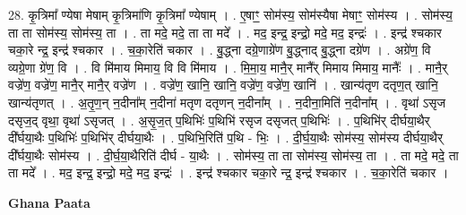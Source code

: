 \documentclass[17pt]{extarticle}
\begin{document}
28. कृ॒त्रिमा᳚ ण्येषा मेषाम् कृ॒त्रिमा॑णि कृ॒त्रिमा᳚ ण्येषाम् । . ए॒षाꣳ॒॒ सोम॑स्य॒ सोम॑स्यैषा मेषाꣳ॒॒ सोम॑स्य । . सोम॑स्य॒ ता ता सोम॑स्य॒ सोम॑स्य॒ ता । . ता मदे॒ मदे॒ ता ता मदे᳚ । . मद॒ इन्द्र॒ इन्द्रो॒ मदे॒ मद॒ इन्द्रः॑ । . इन्द्र॑ श्चकार चका॒रे न्द्र॒ इन्द्र॑ श्चकार । . च॒का॒रेति॑ चकार । . बु॒द्ध्ना दग्रे॒णाग्रे॑ण बु॒द्ध्नाद् बु॒द्ध्ना दग्रे॑ण । . अग्रे॑ण॒ वि व्यग्रे॒णा ग्रे॑ण॒ वि । . वि मि॑माय मिमाय॒ वि वि मि॑माय । . मि॒मा॒य॒ मानै॒र् मानै᳚र् मिमाय मिमाय॒ मानैः᳚ । . मानै॒र् वज्रे॑ण॒ वज्रे॑ण॒ मानै॒र् मानै॒र् वज्रे॑ण । . वज्रे॑ण॒ खानि॒ खानि॒ वज्रे॑ण॒ वज्रे॑ण॒ खानि॑ । . खान्य॑तृण दतृण॒त् खानि॒ खान्य॑तृणत् । . अ॒तृ॒ण॒न् न॒दीना᳚म् न॒दीना॑ मतृण दतृणन् न॒दीना᳚म् । . न॒दीना॒मिति॑ न॒दीना᳚म् । . वृथा॑ ऽसृज दसृज॒द् वृथा॒ वृथा॑ ऽसृजत् । . अ॒सृ॒ज॒त् प॒थिभिः॑ प॒थिभि॑ रसृज दसृजत् प॒थिभिः॑ । . प॒थिभि॑र् दीर्घया॒थैर् दी᳚र्घया॒थैः प॒थिभिः॑ प॒थिभि॑र् दीर्घया॒थैः । . प॒थिभि॒रिति॑ प॒थि - भिः॒ । . दी॒र्घ॒या॒थैः सोम॑स्य॒ सोम॑स्य दीर्घया॒थैर् दी᳚र्घया॒थैः सोम॑स्य । . दी॒र्घ॒या॒थैरिति॑ दीर्घ - या॒थैः । . सोम॑स्य॒ ता ता सोम॑स्य॒ सोम॑स्य॒ ता । . ता मदे॒ मदे॒ ता ता मदे᳚ । . मद॒ इन्द्र॒ इन्द्रो॒ मदे॒ मद॒ इन्द्रः॑ । . इन्द्र॑ श्चकार चका॒रे न्द्र॒ इन्द्र॑ श्चकार । . च॒का॒रेति॑ चकार । \newline

\textbf{Ghana Paata } \newline
\end{document}
